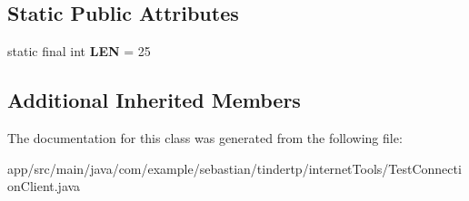 \subsection*{Static Public Attributes}
\begin{DoxyCompactItemize}
\item 
static final int {\bfseries L\+EN} = 25\hypertarget{classcom_1_1example_1_1sebastian_1_1tindertp_1_1internetTools_1_1TestConnectionClient_a3dd1d587594764662f3eddbcd5fe43f6}{}\label{classcom_1_1example_1_1sebastian_1_1tindertp_1_1internetTools_1_1TestConnectionClient_a3dd1d587594764662f3eddbcd5fe43f6}

\end{DoxyCompactItemize}
\subsection*{Additional Inherited Members}


The documentation for this class was generated from the following file\+:\begin{DoxyCompactItemize}
\item 
app/src/main/java/com/example/sebastian/tindertp/internet\+Tools/Test\+Connection\+Client.\+java\end{DoxyCompactItemize}
